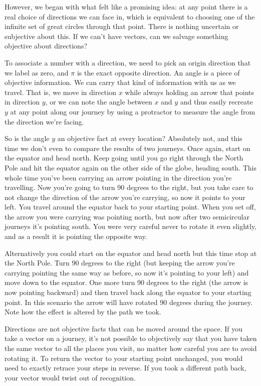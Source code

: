 However, we began with what felt like a promising idea: at any point there is a real choice of directions we can face in, which is equivalent to choosing one of the infinite set of great circles through that point. There is nothing uncertain or subjective about this. If we can't have vectors, can we salvage something objective about directions?

To associate a number with a direction, we need to pick an origin direction that we label as zero, and $\pi$ is the exact opposite direction. An angle is a piece of objective information. We can carry that kind of information with us as we travel. That is, we move in direction $x$ while always holding an arrow that points in direction $y$, or we can note the angle between $x$ and $y$ and thus easily recreate $y$ at any point along our journey by using a protractor to measure the angle from the direction we're facing.

So is the angle $y$ an objective fact at every location? Absolutely not, and this time we don't even to compare the results of two journeys. Once again, start on the equator and head north. Keep going until you go right through the North Pole and hit the equator again on the other side of the globe, heading south. This whole time you've been carrying an arrow pointing in the direction you're travelling. Now you're going to turn 90 degrees to the right, but you take care to not change the direction of the arrow you're carrying, so now it points to your left. You travel around the equator back to your starting point. When you set off, the arrow you were carrying was pointing north, but now after two semicircular journeys it's pointing south. You were very careful never to rotate it even slightly, and as a result it is pointing the opposite way.

Alternatively you could start on the equator and head north but this time stop at the North Pole. Turn 90 degrees to the right (but keeping the arrow you're carrying pointing the same way as before, so now it's pointing to your left) and move down to the equator. One more turn 90 degrees to the right (the arrow is now pointing backward) and then travel back along the equator to your starting point. In this scenario the arrow will have rotated 90 degrees during the journey. Note how the effect is altered by the path we took.

Directions are not objective facts that can be moved around the space. If you take a vector on a journey, it's not possible to objectively say that you have taken the same vector to all the places you visit, no matter how careful you are to avoid rotating it. To return the vector to your starting point unchanged, you would need to exactly retrace your steps in reverse. If you took a different path back, your vector would twist out of recognition.

